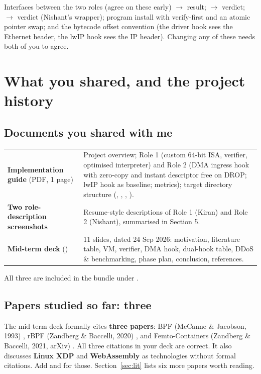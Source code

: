 \documentclass[10pt,a4paper]{article}
\begin{document}
\begin{keybox}{Interfaces between the two roles (agree on these early)}
 $\rightarrow$ result;  $\rightarrow$ verdict;  $\rightarrow$ verdict (Nishant's wrapper); program install with verify-first and an atomic pointer swap; and the bytecode offset convention (the driver hook sees the Ethernet header, the lwIP hook sees the IP header). Changing any of these needs both of you to agree.
\end{keybox}

\section{What you shared, and the project history}
\subsection{Documents you shared with me}
\begin{tabularx}{\textwidth}{@{}P{4.6cm}L@{}}
\toprule
\textbf{Implementation guide} (PDF, 1 page) & Project overview; Role 1 (custom 64-bit ISA, verifier, optimised  interpreter) and Role 2 (DMA ingress hook with zero-copy and instant descriptor free on DROP; lwIP  hook as baseline; metrics); target directory structure (, , , ). \\
\textbf{Two role-description screenshots} & Resume-style descriptions of Role 1 (Kiran) and Role 2 (Nishant), summarised in Section 5. \\
\textbf{Mid-term deck} () & 11 slides, dated 24 Sep 2026: motivation, literature table, VM, verifier, DMA hook, dual-hook table, DDoS \& benchmarking, phase plan, conclusion, references. \\
\bottomrule
\end{tabularx}
All three are included in the bundle under .

\subsection{Papers studied so far: three}
The mid-term deck formally cites \textbf{three papers}: BPF (McCanne \& Jacobson, 1993) \cite{bpf93}, rBPF (Zandberg \& Baccelli, 2020) \cite{rbpf20}, and Femto-Containers (Zandberg \& Baccelli, 2021, arXiv) \cite{fc21}. All three citations in your deck are correct. It also discusses \textbf{Linux XDP} and \textbf{WebAssembly} as technologies without formal citations. Add \cite{xdp18} and \cite{wasm17} for those. Section~\ref{sec:lit} lists six more papers worth reading.
\end{document}
